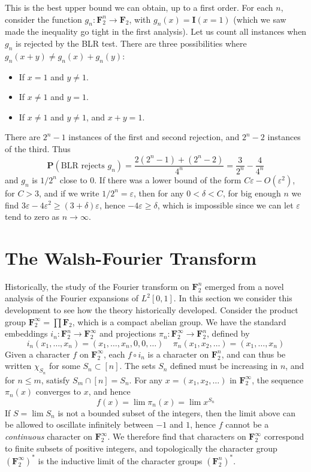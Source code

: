 This is the best upper bound we can obtain, up to a first order. For each $n$, consider the function $g_n: \mathbf{F}_2^n \to \mathbf{F}_2$, with $g_n(x) = \mathbf{I}(x = 1)$ (which we saw made the inequality go tight in the first analysis). Let us count all instances when $g_n$ is rejected by the BLR test. There are three possibilities where $g_n(x + y) \neq g_n(x) + g_n(y)$:
%
\begin{itemize}
    \item If $x = 1$ and $y \neq 1$.
    \item If $x \neq 1$ and $y = 1$.
    \item If $x \neq 1$ and $y \neq 1$, and $x + y = 1$.
\end{itemize}
%
There are $2^n - 1$ instances of the first and second rejection, and $2^n - 2$ instances of the third. Thus
%
\[ \mathbf{P}(\text{BLR rejects $g_n$}) = \frac{2(2^n - 1) + (2^n - 2)}{4^n} = \frac{3}{2^n} - \frac{4}{4^n} \]
%
and $g_n$ is $1/2^n$ close to $0$. If there was a lower bound of the form $C \varepsilon - O(\varepsilon^2)$, for $C > 3$, and if we write $1/2^n = \varepsilon$, then for any $0 < \delta < C$, for big enough $n$ we find $3\varepsilon - 4\varepsilon^2 \geq (3 + \delta) \varepsilon$, hence $-4\varepsilon \geq \delta$, which is impossible since we can let $\varepsilon$ tend to zero as $n \to \infty$.
 
\section{The Walsh-Fourier Transform}

Historically, the study of the Fourier transform on $\mathbf{F}_2^n$ emerged from a novel analysis of the Fourier expansions of $L^2[0,1]$. In this section we consider this development to see how the theory historically developed. Consider the product group $\mathbf{F}_2^\infty = \prod \mathbf{F}_2$, which is a compact abelian group. We have the standard embeddings $i_n: \mathbf{F}_2^n \to \mathbf{F}_2^\infty$ and projections $\pi_n: \mathbf{F}_2^\infty \to \mathbf{F}_2^n$, defined by
%
\[ i_n(x_1, \dots, x_n) = (x_1, \dots, x_n, 0, 0, \dots)\ \ \ \ \ \pi_n(x_1, x_2, \dots) = (x_1, \dots, x_n) \]
%
Given a character $f$ on $\mathbf{F}_2^\infty$, each $f \circ i_n$ is a character on $\mathbf{F}_2^n$, and can thus be written $\chi_{S_n}$ for some $S_n \subset [n]$. The sets $S_n$ defined must be increasing in $n$, and for $n \leq m$, satisfy $S_m \cap [n] = S_n$. For any $x = (x_1, x_2, \dots)$ in $\mathbf{F}_2^\infty$, the sequence $\pi_n(x)$ converges to $x$, and hence
%
\[ f(x) = \lim \pi_n(x) = \lim x^{S_n} \]
%
If $S = \lim S_n$ is not a bounded subset of the integers, then the limit above can be allowed to oscillate infinitely between $-1$ and $1$, hence $f$ cannot be a {\it continuous} character on $\mathbf{F}_2^\infty$. We therefore find that characters on $\mathbf{F}_2^\infty$ correspond to finite subsets of positive integers, and topologically the character group $(\mathbf{F}_2^\infty)^*$ is the inductive limit of the character groups $(\mathbf{F}_2^n)^*$.

